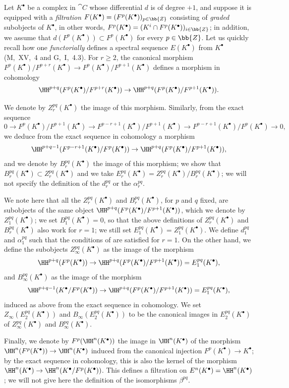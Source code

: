 \begin{env}[11.2.2]
\label{0.11.2.2}
Let $K^\bullet$ be a complex in $\cat{C}$ whose differential $d$ is of degree $+1$, and suppose it is equipped with a \emph{filtration $F(K^\bullet)=(F^p(K^\bullet))_{p\in\bb{Z}}$} consisting of \emph{graded} subobjects
of $K^\bullet$, in other words, $F^p(K^\bullet)=(K^i\cap F^p(K^\bullet))_{i\in\bb{Z}}$; in addition, we assume that $d(F^p(K^\bullet))\subset F^p(K^\bullet)$ for every $p\in\bb{Z}$.
Let us quickly recall how one \emph{functorially} defines a spectral sequence $E(K^\bullet)$ from $K^\bullet$ (M,~XV,~4 and G,~I,~4.3).
For $r\geq 2$, the canonical morphism $F^p(K^\bullet)/F^{p+r}(K^\bullet)\to F^p(K^\bullet)/F^{p+1}(K^\bullet)$ defines a morphism in cohomology
\[
  \HH^{p+q}(F^p(K^\bullet)/F^{p+r}(K^\bullet))\to\HH^{p+q}(F^p(K^\bullet)/F^{p+1}(K^\bullet)).
\]

We denote by $Z_r^{pq}(K^\bullet)$ the image of this morphism.
Similarly, from the exact sequence
\[
  0\to F^p(K^\bullet)/F^{p+1}(K^\bullet)\to F^{p-r+1}(K^\bullet)/F^{p+1}(K^\bullet)\to F^{p-r+1}(K^\bullet)/F^p(K^\bullet)\to 0,
\]
we deduce from the exact sequence in cohomology a morphism
\[
  \HH^{p+q-1}(F^{p-r+1}(K^\bullet)/F^p(K^\bullet))\to\HH^{p+q}(F^p(K^\bullet)/F^{p+1}(K^\bullet)),
\]
and we denote by $B_r^{pq}(K^\bullet)$ the image of this morphism; we show that $B_r^{pq}(K^\bullet)\subset Z_r^{pq}(K^\bullet)$ and we take $E_r^{pq}(K^\bullet)=Z_r^{pq}(K^\bullet)/B_r^{pq}(K^\bullet)$; we will not specify the definition of the $d_r^{pq}$ or the $\alpha_r^{pq}$.

We note here that all the $Z_r^{pq}(K^\bullet)$ and $B_r^{pq}(K^\bullet)$, for $p$ and $q$ fixed, are subobjects of the same object $\HH^{p+q}(F^p(K^\bullet)/F^{p+1}(K^\bullet))$, which we denote by $Z_1^{pq}(K^\bullet)$; we set $B_1^{pq}(K^\bullet)=0$, so that the above definitions of $Z_r^{pq}(K^\bullet)$ and $B_r^{pq}(K^\bullet)$ also work for $r=1$; we still set $E_1^{pq}(K^\bullet)=Z_1^{pq}(K^\bullet)$.
We define $d_1^{pq}$ and $\alpha_1^{pq}$ such that the conditions of  are satisfied for $r=1$.
On the other hand, we define the subobjects $Z_\infty^{pq}(K^\bullet)$ as the image of the morphism
\[
  \HH^{p+q}(F^p(K^\bullet))\to\HH^{p+q}(F^p(K^\bullet)/F^{p+1}(K^\bullet))=E_1^{pq}(K^\bullet),
\]
and $B_\infty^{pq}(K^\bullet)$ as the image of the morphism
\[
  \HH^{p+q-1}(K^\bullet/F^p(K^\bullet))\to\HH^{p+q}(F^p(K^\bullet)/F^{p+1}(K^\bullet))=E_1^{pq}(K^\bullet),
\]
induced as above from the exact sequence in cohomology.
We set $Z_\infty(E_2^{pq}(K^\bullet))$ and $B_\infty(E_2^{pq}(K^\bullet))$ to be the canonical images in $E_2^{pq}(K^\bullet)$ of $Z_\infty^{pq}(K^\bullet)$ and $B_\infty^{pq}(K^\bullet)$.

Finally, we denote by $F^p(\HH^n(K^\bullet))$ the image in $\HH^n(K^\bullet)$ of the morphism $\HH^n(F^p(K^\bullet))\to\HH^n(K^\bullet)$ induced from the canonical injection $F^p(K^\bullet)\to K^\bullet$; by the exact sequence in cohomology, this is also the kernel of the morphism $\HH^n(K^\bullet)\to\HH^n(K^\bullet/F^p(K^\bullet))$.
This defines a filtration on $E^n(K^\bullet)=\HH^n(K^\bullet)$; we will not give here the definition of the isomorphisms $\beta^{pq}$.
\end{env}
